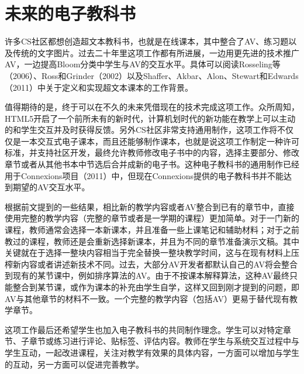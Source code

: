 \chapter{未来的电子教科书}
\begin{sectext}
许多CS社区都想创造超文本教科书，也就是在线课本，其中整合了AV、练习题以及传统的文字图片。过去二十年里这项工作都有所进展，一边用更先进的技术推广AV，一边提高Bloom分类中学生与AV的交互水平。具体可以阅读Rosseling等（2006）、Ross和Grinder（2002）以及Shaffer、Akbar、Alon、Stewart和Edwards（2011）中关于定义和实现超文本课本的工作背景。

值得期待的是，终于可以在不久的未来凭借现在的技术完成这项工作。众所周知，HTML5开启了一个前所未有的新时代，计算机划时代的新功能在教学上可以主动的和学生交互并及时获得反馈。另外CS社区非常支持通用制作，这项工作将不仅仅是一本交互式电子课本，而且还能够制作课本，也就是说这项工作制定一种许可标准，并支持社区开发，最终允许教师修改电子书中的内容，选择主要部分、修改章节或者从其他书本中节选后合并成新的电子书。这种电子教科书的通用制作已经用于Connexions项目（2011）中，但现在Connexions提供的电子教科书并不能达到期望的AV交互水平。

根据前文提到的一些结果，相比新的教学内容或者AV整合到已有的章节中，直接使用完整的教学内容（完整的章节或者是一学期的课程）更加简单。对于一门新的课程，教师通常会选择一本新课本，并且准备一些上课笔记和辅助材料；对于之前教过的课程，教师还是会重新选择新课本，并且为不同的章节准备演示文稿。其中关键就在于选择一整块内容相当于完全替换一整块教学时间，这与在现有材料上压榨新内容或者讲述新技术不同。过去，大部分AV开发者都默认自己的AV将会整合到现有的某节课中，例如排序算法的AV。由于不按课本解释算法，这种AV最终只能整合到某节课，或作为课本的补充由学生自学，这样又回到刚才提到的问题，即AV与其他章节的材料不一致。一个完整的教学内容（包括AV）更易于替代现有教学章节。

这项工作最后还希望学生也加入电子教科书的共同制作理念。学生可以对特定章节、子章节或练习进行评论、贴标签、评估内容。教师在学生与系统交互过程中与学生互动，一起改进课程，关注对教学有效果的具体内容，一方面可以增加与学生的互动，另一方面可以促进完善教学。
\end{sectext}
